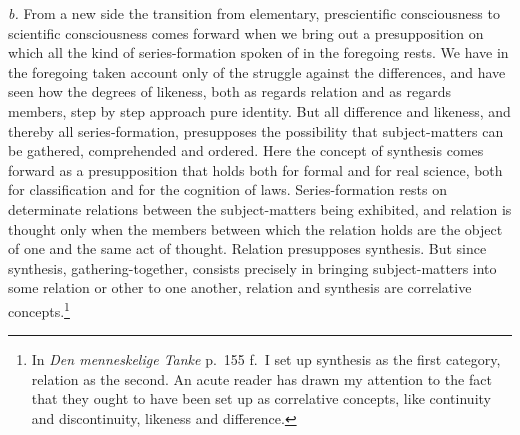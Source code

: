 \documentclass[12pt]{book}
\newcommand{\opage}[1]{\marginnote{\footnotesize\textit{[#1]}}}
\begin{document}
\textit{b.} From a new side the transition from elementary, prescientific
consciousness to scientific consciousness comes forward when we bring out a
presupposition on which all the kind of series-formation spoken of in the
foregoing rests. We have in the foregoing taken account only of the struggle
against the differences, and have seen how the degrees of likeness, both as
regards relation and as regards members, step by step approach pure identity.
But all difference and likeness, and thereby all series-formation, presupposes
the possibility that subject-matters can be gathered, comprehended and ordered.
Here the concept of synthesis comes forward as a presupposition that holds both
for formal and for real science, both for classification and for the cognition
of laws. Series-formation rests on determinate relations between the
subject-matters being exhibited, and relation is thought only when the members
between which the relation holds are the object of one and the same act of
thought. Relation presupposes synthesis. But since \opage{12}synthesis,
gathering-together, consists precisely in bringing subject-matters into some
relation or other to one another, relation and synthesis are correlative
concepts.\footnote{In \textit{Den menneskelige Tanke} p.\ 155 f.\ I set up
synthesis as the first category, relation as the second. An acute reader has
drawn my attention to the fact that they ought to have been set up as
correlative concepts, like continuity and discontinuity, likeness and
difference.}
\end{document}
